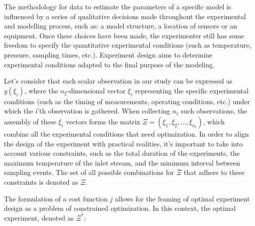 \documentclass[../Article_Design_of_Experiment.tex]{subfiles}
\begin{document}
	The methodology for data to estimate the parameters of a specific model is influenced by a series of qualitative decisions made throughout the experimental and modelling process, such as: a model structure, a location of sensors or an equipment. Once these choices have been made, the experimenter still has some freedom to specify the quantitative experimental conditions (such as temperature, pressure, sampling times, etc.). Experiment design aims to determine experimental conditions adapted to the final purpose of the modeling. 
	
	
	Let's consider that each scalar observation in our study can be expressed as $y(\xi_i)$, where the $n_\xi$-dimensional vector $\xi_i$ representing the specific experimental conditions (such as the timing of measurements, operating conditions, etc.) under which the i'th observation is gathered. When collecting $n_t$ such observations, the assembly of these $\xi_i$ vectors forms the matrix $\Xi = (\xi_1, \xi_2,..., \xi_{n_t})$, which combine all the experimental conditions that need optimization. In order to align the design of the experiment with practical realities, it's important to take into account various constraints, such as the total duration of the experiments, the maximum temperature of the inlet stream, and the minimum interval between sampling events. The set of all possible combinations for $\bar{\Xi}$ that adhere to these constraints is denoted as $\Xi$.
	
	
	The formulation of a cost function $j$ allows for the framing of optimal experiment design as a problem of constrained optimization. In this context, the optimal experiment, denoted as $\Xi^*$:
	
\end{document}
